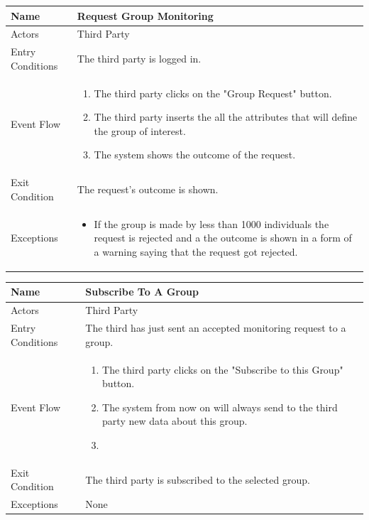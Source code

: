\begin{enumerate}
\FloatBarrier
\begin{table}[h]
\begin{tabular}{|l|l|}
\hline
Name             & Request Group Monitoring \\ \hline
Actors           & Third Party  \\ \hline
Entry Conditions & The third party is logged in.    \\ \hline
Event Flow       & \parbox{.45\textwidth}{\begin{enumerate}
            \item The third party clicks on the "Group Request" button.
            \item The third party inserts the all the attributes that will define the group of interest.
            \item The system shows the outcome of the request. 
        \end{enumerate}}\\ \hline
Exit Condition   & The request's outcome is shown.\\ \hline
Exceptions       & \parbox{.45\textwidth}  
{\begin{itemize}
\item If the group is made by less than 1000 individuals the request is rejected and a the outcome is shown in a form of a warning saying that the request got rejected.
\end{itemize}}\\ \hline
\end{tabular}
\end{table}
\FloatBarrier

\FloatBarrier
\begin{table}[h]
\begin{tabular}{|l|l|}
\hline
Name             & Subscribe To A Group\\ \hline
Actors           & Third Party  \\ \hline
Entry Conditions & The third has just sent an accepted monitoring request to a group. \\ \hline
Event Flow       & \parbox{.45\textwidth}{\begin{enumerate}
            \item The third party clicks on the "Subscribe to this Group" button.
            \item The system from now on will always send to the third party new data about this group.
            \item 
        \end{enumerate}}\\ \hline
Exit Condition   & The third party is subscribed to the selected group.\\ \hline
Exceptions       & None \\ \hline
\end{tabular}
\end{table}
\FloatBarrier



\end{enumerate}
